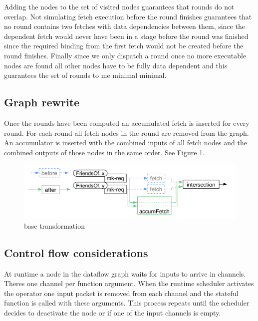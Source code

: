 Adding the \fetch{} nodes to the set of visited nodes guarantees that rounds do not overlap.
Not simulating fetch execution before the round finishes guarantees that no round contains two fetches with data dependencies between them, since the dependent fetch would never have been in a stage before the round was finished since the required binding from the first fetch would not be created before the round finishes.
Finally since we only dispatch a round once no more executable nodes are found all other nodes have to be fully data dependent and this guarantees the set of rounds to me minimal minimal.

\subsection{Graph rewrite}

Once the rounds have been computed an accumulated fetch is inserted for every round.
For each round all fetch nodes in the round are removed from the graph.
An accumulator is inserted with the combined inputs of all fetch nodes and the combined outputs of those nodes in the same order. See Figure \ref{figure:yauhau-transformation}.

\begin{figure}
	\includegraphics[width=\textwidth]{Figures/yauhau-transformation}
	\caption{base transformation}
	\label{figure:yauhau-transformation}
\end{figure}

\subsection{Control flow considerations}

At runtime a node in the dataflow graph waits for inputs to arrive in channels.
Theres one channel per function argument.
When the runtime scheduler activates the operator one input packet is removed from each channel and the stateful function is called with these arguments.
This process repeats until the scheduler decides to deactivate the node or if one of the input channels is empty.


